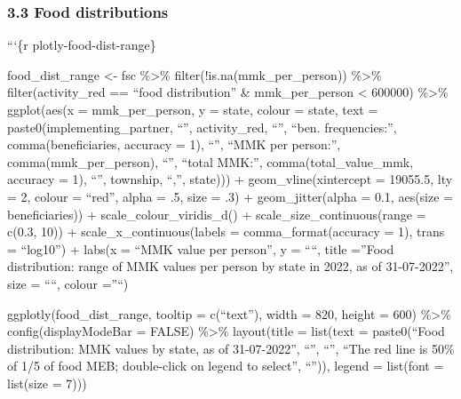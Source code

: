 \documentclass[
]{article}
\begin{document}
\hypertarget{food-distributions}{%
\subsubsection{3.3 Food distributions}\label{food-distributions}}

```\{r plotly-food-dist-range\}

food\_dist\_range \textless- fsc \%\textgreater\%
filter(!is.na(mmk\_per\_person)) \%\textgreater\% filter(activity\_red
== ``food distribution'' \& mmk\_per\_person \textless{} 600000)
\%\textgreater\% ggplot(aes(x = mmk\_per\_person, y = state, colour =
state, text = paste0(implementing\_partner, ``\n'', activity\_red,
``\n'', ``ben. frequencies:'', comma(beneficiaries, accuracy = 1),
``\n'', ``MMK per person:'', comma(mmk\_per\_person), ``\n'', ``total
MMK:'', comma(total\_value\_mmk, accuracy = 1), ``\n'', township, ``,'',
state))) + geom\_vline(xintercept = 19055.5, lty = 2, colour = ``red'',
alpha = .5, size = .3) + geom\_jitter(alpha = 0.1, aes(size =
beneficiaries)) + scale\_colour\_viridis\_d() +
scale\_size\_continuous(range = c(0.3, 10)) +
scale\_x\_continuous(labels = comma\_format(accuracy = 1), trans =
``log10'') + labs(x = ``MMK value per person'', y = ````, title =''Food
distribution: range of MMK values per person by state in 2022, as of
31-07-2022'', size = ````, colour =''``)

ggplotly(food\_dist\_range, tooltip = c(``text''), width = 820, height =
600) \%\textgreater\% config(displayModeBar = FALSE) \%\textgreater\%
layout(title = list(text = paste0(``Food distribution: MMK values by
state, as of 31-07-2022'', ``'', ``'', ``The red line is 50\% of 1/5 of
food MEB; double-click on legend to select'', ``'')), legend = list(font
= list(size = 7)))
\end{document}
